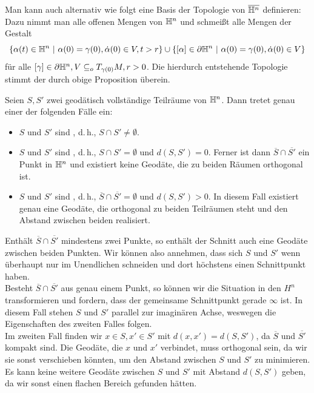 \documentclass{book}
\begin{document}
\Bem{}
Man kann auch alternativ wie folgt eine Basis der Topologie von $\overline{\mathbb{H}^n}$ definieren: Dazu nimmt man alle offenen Mengen von $\mathbb{H}^n$ und schmeißt alle Mengen der Gestalt
\[ \{ \alpha(t) \in \H^n~|~ \alpha(0) = \gamma(0), \dot{\alpha}(0)  \in V ,t > r\} \cup \set{ [\alpha] \in \partial \H^n }{\alpha(0) = \gamma(0),\dot{\alpha}(0)  \in V} \]
für alle $[\gamma] \in \partial \mathbb{H}^n, V \subseteq_o T_{\gamma(0)}M, r > 0$. Die hierdurch entstehende Topologie stimmt der durch obige Proposition überein.

\Prop{}
Seien $S,S'$ zwei geodätisch vollständige Teilräume von $\mathbb{H}^n$. Dann tretet genau einer der folgenden Fälle ein:
\begin{itemize}
	\item $S$ und $S'$ sind , d.\,h., $S\cap S'\neq \emptyset$.
	\item $S$ und $S'$ sind , d.\,h., $S\cap S' = \emptyset$ und $d(S, S') = 0$. Ferner ist dann $\overline{S} \cap \overline{S'}$ ein Punkt in $\mathbb{H}^n$ und existiert keine Geodäte, die zu beiden Räumen orthogonal ist.
	\item $S$ und $S'$ sind , d.\,h., $\overline{S}\cap \overline{S'} = \emptyset$ und $d(S, S') > 0$. In diesem Fall existiert genau eine Geodäte, die orthogonal zu beiden Teilräumen steht und den Abstand zwischen beiden realisiert.
\end{itemize}
\begin{Beweis}{}
	Enthält $\overline{S} \cap \overline{S'}$ mindestens zwei Punkte, so enthält der Schnitt auch eine Geodäte zwischen beiden Punkten. Wir können also annehmen, dass sich $S$ und $S'$ wenn überhaupt nur im Unendlichen schneiden und dort höchstens einen Schnittpunkt haben.\\
	Besteht $\overline{S} \cap \overline{S'}$ aus genau einem Punkt, so können wir die Situation in den $H^n$ transformieren und fordern, dass der gemeinsame Schnittpunkt gerade $\infty$ ist. In diesem Fall stehen $S$ und $S'$ parallel zur imaginären Achse, weswegen die Eigenschaften des zweiten Falles folgen.\\
	Im zweiten Fall finden wir $x\in S, x' \in S'$ mit $d(x,x') = d(S, S')$, da $\overline{S}$ und $\overline{S'}$ kompakt sind. Die Geodäte, die $x$ und $x'$ verbindet, muss orthogonal sein, da wir sie sonst verschieben könnten, um den Abstand zwischen $S$ und $S'$ zu minimieren. Es kann keine weitere Geodäte zwischen $S$ und $S'$ mit Abstand $d(S, S')$ geben, da wir sonst einen flachen Bereich gefunden hätten.
\end{Beweis}
\end{document}
